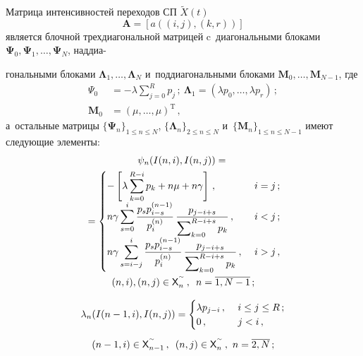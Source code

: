 \begin{multicols}{2}
  Матрица интенсивностей переходов СП $\tilde{X}(t)$ 
  $$
  \mathbf{A}=  [a((i,j),(k,r))]$$ 
  является блочной трехдиагональной матрицей 
c~диагональными блоками $\boldsymbol{\Psi}_0, 
\boldsymbol{\Psi}_1, \ldots , \boldsymbol{\Psi}_N$, наддиа-\linebreak\vspace*{-12pt}

\pagebreak

\noindent
гональными 
блоками $\boldsymbol{\Lambda}_1,\ldots , \boldsymbol{\Lambda}_N$ и~поддиагональными блоками 
$\mathbf{M}_0,\ldots , \mathbf{M}_{N-1}$, где 
\begin{align*}
\Psi_0&= -\lambda 
\sum\limits_{j=0}^R p_j\,;\ 
 \boldsymbol{\Lambda}_1=\left(\lambda p_0,\ldots, \lambda p_r\right)\,;
\\
\mathbf{M}_0&= \left(\mu, \ldots, \mu\right)^{\mathrm{T}}\,,
\end{align*}
 а~остальные матрицы 
$\{\boldsymbol{\Psi}_n\}_{1\leq n\leq N}$, $\{\boldsymbol{\Lambda}_n\}_{2\leq n\leq N}$ 
и~$\{\mathbf{M}_n\}_{1\leq n\leq N-1}$ имеют следующие элементы:
  \begin{multline}
  \psi_n(I(n,i),I(n,j))={}\\
  {}=\begin{cases}
  \displaystyle-\left[ \lambda \sum\limits_{k=0}^{R-i} p_k 
+n\mu+n\gamma\right]\,, &\ i=j\,;\\[5pt]
  \displaystyle n\gamma\sum\limits_{s=0}^i \fr{p_sp_{i-s}^{(n-
1)}}{p_i^{(n)}}\,\fr{p_{j-i+s}}{\sum\nolimits_{k=0}^{R-i+s}p_k}\,, &\ i<j\,;\\[5pt]
  \displaystyle n\gamma\sum\limits^i_{s=i-j} \fr{p_s p_{i-s}^{(n-1)}} 
{p_i^{(n)}}\, \fr{p_{j-i+s}}{\sum\nolimits_{k=0}^{R-i+s} p_k}\,, &\ i>j\,,
  \end{cases}\\
     (n,i), (n,j)\in {\sf X}_n^{\sptilde}\,,\enskip 
  n=\overline{1,N-1}\,;
  \label{e1-sop}
  \end{multline}
  
  \vspace*{-12pt}
  
\noindent
  \begin{multline}
  \lambda_n(I(n-1,i),I(n,j))=\begin{cases}
  \lambda p_{j-i}\,, &\ i\leq j\leq R\,;\\
  0\,, &\ j<i\,,\end{cases}\\[5pt]
  (n-1,i)\in {\sf X}_{n-1}^{\sptilde}\,,\enskip
  (n,j)\in {\sf X}^{\sptilde}_n\,,\ n=\overline{2,N}\,;
  \label{e2-sop}
  \end{multline}
  

\end{multicols}
